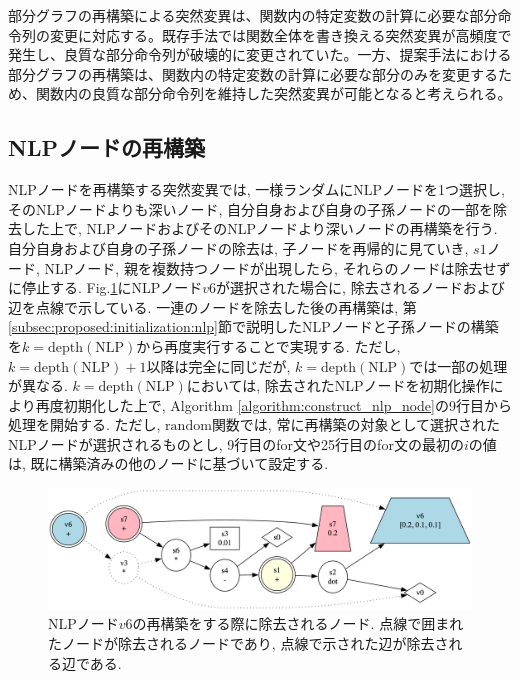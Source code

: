 \documentclass[11pt,oneside,openany,report]{jsbook}
\begin{document}
部分グラフの再構築による突然変異は、関数内の特定変数の計算に必要な部分命令列の変更に対応する。既存手法では関数全体を書き換える突然変異が高頻度で発生し、良質な部分命令列が破壊的に変更されていた。一方、提案手法における部分グラフの再構築は、関数内の特定変数の計算に必要な部分のみを変更するため、関数内の良質な部分命令列を維持した突然変異が可能となると考えられる。

\subsection{NLPノードの再構築}
NLPノードを再構築する突然変異では, 一様ランダムにNLPノードを1つ選択し, そのNLPノードよりも深いノード, 自分自身および自身の子孫ノードの一部を除去した上で, NLPノードおよびそのNLPノードより深いノードの再構築を行う. 自分自身および自身の子孫ノードの除去は, 子ノードを再帰的に見ていき, $s1$ノード, NLPノード, 親を複数持つノードが出現したら, それらのノードは除去せずに停止する. Fig.\ref{fig:mgg_automl_zero_vag:mutation:reconstruct_nlp}にNLPノード$v6$が選択された場合に, 除去されるノードおよび辺を点線で示している. 一連のノードを除去した後の再構築は, 第\ref{subsec:proposed:initialization:nlp}節で説明したNLPノードと子孫ノードの構築を$k=\mathrm{depth}(\mathrm{NLP})$から再度実行することで実現する. ただし, $k=\mathrm{depth}(\mathrm{NLP}) + 1$以降は完全に同じだが, $k=\mathrm{depth}(\mathrm{NLP})$では一部の処理が異なる. $k=\mathrm{depth}(\mathrm{NLP})$においては, 除去されたNLPノードを初期化操作により再度初期化した上で, Algorithm \ref{algorithm:construct_nlp_node}の9行目から処理を開始する. ただし, $\mathrm{random}$関数では, 常に再構築の対象として選択されたNLPノードが選択されるものとし, 9行目のfor文や25行目のfor文の最初の$i$の値は, 既に構築済みの他のノードに基づいて設定する.

\begin{figure}
  \centering
  \includegraphics[width=14cm]{mgg_automl_zero_vag/mutations/reconstruct_nlp.png}
  \caption{NLPノード$v6$の再構築をする際に除去されるノード. 点線で囲まれたノードが除去されるノードであり, 点線で示された辺が除去される辺である. }
  \label{fig:mgg_automl_zero_vag:mutation:reconstruct_nlp}
\end{figure}
\end{document}
